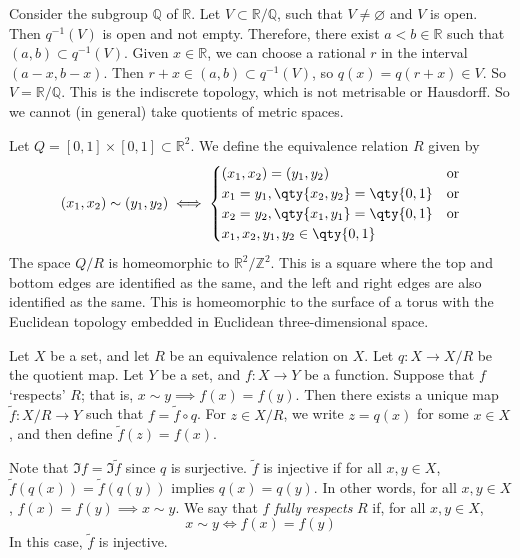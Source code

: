 \begin{example}
	Consider the subgroup \( \mathbb Q \) of \( \mathbb R \).
	Let \( V \subset \mathbb R / \mathbb Q \), such that \( V \neq \varnothing \) and \( V \) is open.
	Then \( q^{-1}(V) \) is open and not empty.
	Therefore, there exist \( a < b \in \mathbb R \) such that \( (a,b) \subset q^{-1}(V) \).
	Given \( x \in \mathbb R \), we can choose a rational \( r \) in the interval \( (a-x, b-x) \).
	Then \( r + x \in (a,b) \subset q^{-1}(V) \), so \( q(x) = q(r+x) \in V \).
	So \( V = \mathbb R / \mathbb Q \).
	This is the indiscrete topology, which is not metrisable or Hausdorff.
	So we cannot (in general) take quotients of metric spaces.
\end{example}
\begin{example}
	Let \( Q = [0,1] \times [0,1] \subset \mathbb R^2 \).
	We define the equivalence relation \( R \) given by
	\[
		(x_1, x_2) \sim (y_1, y_2) \iff
		\begin{cases}
			(x_1, x_2) = (y_1, y_2)               & \text{or} \\
			x_1 = y_1, \qty{x_2, y_2} = \qty{0,1} & \text{or} \\
			x_2 = y_2, \qty{x_1, y_1} = \qty{0,1} & \text{or} \\
			x_1, x_2, y_1, y_2 \in \qty{0,1}
		\end{cases}
	\]
	The space \( Q / R \) is homeomorphic to \( \mathbb R^2 / \mathbb Z^2 \).
	This is a square where the top and bottom edges are identified as the same, and the left and right edges are also identified as the same.
	This is homeomorphic to the surface of a torus with the Euclidean topology embedded in Euclidean three-dimensional space.
\end{example}
\begin{proposition}
	Let \( X \) be a set, and let \( R \) be an equivalence relation on \( X \).
	Let \( q \colon X \to X/R \) be the quotient map.
	Let \( Y \) be a set, and \( f \colon X \to Y \) be a function.
	Suppose that \( f \) `respects' \( R \); that is, \( x \sim y \implies f(x) = f(y) \).
	Then there exists a unique map \( \widetilde f \colon X/R \to Y \) such that \( f = \widetilde f \circ q \).
	For \( z \in X/R \), we write \( z = q(x) \) for some \( x \in X \), and then define \( \widetilde f(z) = f(x) \).
\end{proposition}
\begin{remark}
	Note that \( \Im f = \Im \widetilde f \) since \( q \) is surjective.
	\( \widetilde f \) is injective if for all \( x, y \in X \), \( \widetilde f(q(x)) = \widetilde f(q(y)) \) implies \( q(x) = q(y) \).
	In other words, for all \( x,y \in X \), \( f(x) = f(y) \implies x \sim y \).
	We say that \( f \) \textit{fully respects} \( R \) if, for all \( x,y \in X \),
	\[
		x \sim y \iff f(x) = f(y)
	\]
	In this case, \( \widetilde f \) is injective.
\end{remark}


